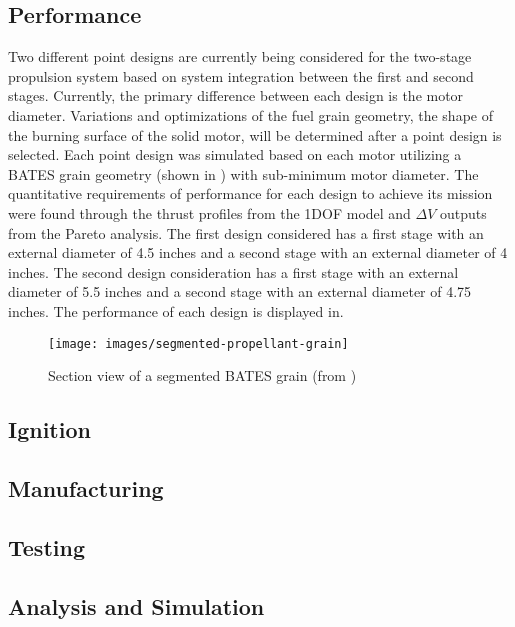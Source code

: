 \subsection{Performance}
Two different point designs are currently being considered for the two-stage propulsion system based on system integration between the first and second stages. Currently, the primary difference between each design is the motor diameter. Variations and optimizations of the fuel grain geometry, the shape of the burning surface of the solid motor, will be determined after a point design is selected. Each point design was simulated based on each motor utilizing a BATES grain geometry (shown in ) with sub-minimum motor diameter. The quantitative requirements of performance for each design to achieve its mission were found through the thrust profiles from the 1DOF model and \(\Delta V\) outputs from the Pareto analysis. The first design considered has a first stage with an external diameter of 4.5 inches and a second stage with an external diameter of 4 inches. The second design consideration has a first stage with an external diameter of 5.5 inches and a second stage with an external diameter of 4.75 inches. The performance of each design is displayed in.  %

\begin{figure}
    \centering
    \texttt{[image: images/segmented-propellant-grain]}
    \caption{Section view of a segmented BATES grain (from \cite{zeller})} %
    \label{figure:segmented-grain}
\end{figure}

\subsection{Ignition}
\subsection{Manufacturing}
\subsection{Testing}
\subsection{Analysis and Simulation}
